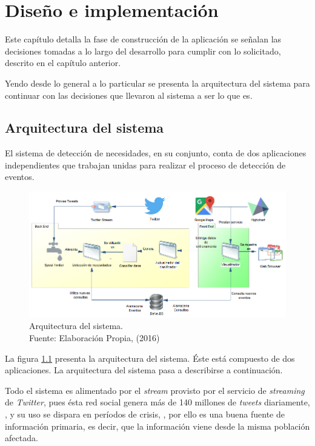 \chapter{Diseño e implementación}
\label{cap:Diseno}

Este capítulo detalla la fase de construcción de la aplicación se señalan las decisiones tomadas a lo largo del desarrollo para cumplir con lo solicitado, descrito en el capítulo anterior.

Yendo desde lo general a lo particular se presenta la arquitectura del sistema para continuar con las decisiones que llevaron al sistema a ser lo que es.

\section{Arquitectura del sistema}
\label{sec:Arquitectura}

El sistema de detección de necesidades, en su conjunto, conta de dos aplicaciones independientes que trabajan unidas para realizar el proceso de detección de eventos. 

\begin{figure}[H]
	\centering
	\captionsetup{justification=centering}
	\includegraphics[scale=0.6]{images/arquitectura.png}
	\caption[Arquitectura del sistema.]{Arquitectura del sistema.\\Fuente: Elaboración Propia, (2016)}
	\label{fig:arquitecturaSistema}
\end{figure}

La figura \ref{fig:arquitecturaSistema} presenta la arquitectura del sistema. Éste está compuesto de dos aplicaciones. La arquitectura del sistema pasa a describirse a continuación.

Todo el sistema es alimentado por el \textit{stream} provisto por el servicio de \textit{streaming} de \textit{Twitter}, pues ésta red social genera más de 140 millones de \textit{tweets} diariamente, \cite{StormIBM}, y su uso se dispara en períodos de crisis, \cite{TaxonomiaChato}, por ello es una buena fuente de información primaria, es decir, que la información viene desde la misma población afectada.

